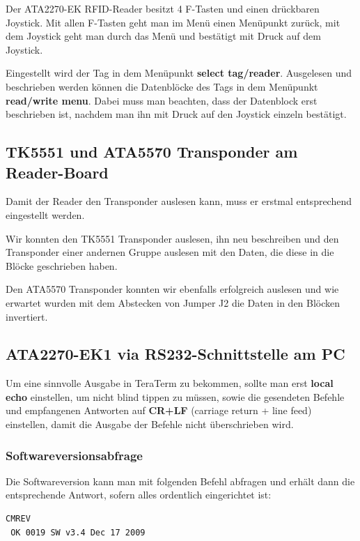 \documentclass[paper=a4,fontsize=11pt,headsepline,footsepline,parskip=half]{scrartcl}
\begin{document}
Der ATA2270-EK RFID-Reader besitzt 4 F-Tasten und einen drückbaren Joystick. Mit allen F-Tasten geht man im Menü einen Menüpunkt zurück,
mit dem Joystick geht man durch das Menü und bestätigt mit Druck auf dem Joystick.

Eingestellt wird der Tag in dem Menüpunkt \textbf{select tag/reader}. Ausgelesen und beschrieben werden können die Datenblöcke des Tags
in dem Menüpunkt \textbf{read/write menu}. Dabei muss man beachten, dass der Datenblock erst beschrieben ist, nachdem man ihn mit
Druck auf den Joystick einzeln bestätigt.

\subsection{TK5551 und ATA5570 Transponder am Reader-Board}

Damit der Reader den Transponder auslesen kann, muss er erstmal entsprechend eingestellt werden.

Wir konnten den TK5551 Transponder auslesen, ihn neu beschreiben und den Transponder einer andernen Gruppe auslesen mit den Daten, die
diese in die Blöcke geschrieben haben.

Den ATA5570 Transponder konnten wir ebenfalls erfolgreich auslesen und wie erwartet wurden mit dem Abstecken von Jumper J2 die Daten in den Blöcken invertiert.

\subsection{ATA2270-EK1 via RS232-Schnittstelle am PC}

Um eine sinnvolle Ausgabe in TeraTerm zu bekommen, sollte man erst \textbf{local echo} einstellen, um nicht blind tippen zu müssen,
sowie die gesendeten Befehle und empfangenen Antworten auf \textbf{CR+LF} (carriage return + line feed) einstellen, damit die Ausgabe der
Befehle nicht überschrieben wird.

\subsubsection{Softwareversionsabfrage}

Die Softwareversion kann man mit folgenden Befehl abfragen und erhält dann die entsprechende Antwort, sofern alles ordentlich eingerichtet ist:

\begin{lstlisting}[caption={Softwareversionsabfrage.}]
 CMREV
 OK 0019 SW v3.4 Dec 17 2009
\end{lstlisting}
\end{document}
